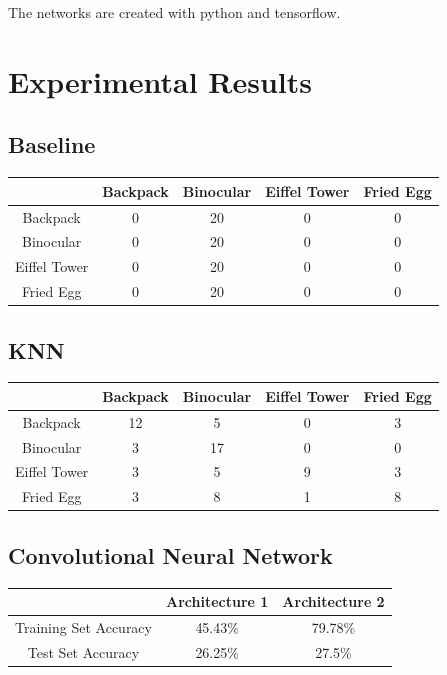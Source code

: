 \documentclass{article} %
\begin{document}
The networks are created with python and tensorflow.

\section{Experimental Results}

\subsection{Baseline}

\centering
\begin{tabular}{|c|c|c|c|c|}
\hline 
&
Backpack &
Binocular &
Eiffel Tower &
Fried Egg \\
\hline 
Backpack &
0 &
20 &
0 &
0 \\
\hline 
Binocular &
0 &
20 &
0 &
0 \\
\hline 
Eiffel Tower &
0 &
20 &
0 &
0 \\
\hline
Fried Egg &
0 &
20 &
0 &
0 \\
\hline
\end{tabular}


\subsection{KNN}

\centering
\begin{tabular}{|c|c|c|c|c|}
\hline 
&
Backpack &
Binocular &
Eiffel Tower &
Fried Egg \\
\hline 
Backpack &
12 &
5 &
0 &
3 \\
\hline 
Binocular &
3 &
17 &
0 &
0 \\
\hline 
Eiffel Tower &
3 &
5 &
9 &
3 \\
\hline
Fried Egg &
3 &
8 &
1 &
8 \\
\hline
\end{tabular}


\subsection{Convolutional Neural Network}

\centering
\begin{tabular}{|c|c|c|}
\hline 
&
Architecture 1 &
Architecture 2 \\
\hline 
Training Set Accuracy &
45.43\% &
79.78\% \\
\hline 
Test Set Accuracy &
26.25\% &
27.5\% \\
\hline 
\end{tabular}
\end{document}

